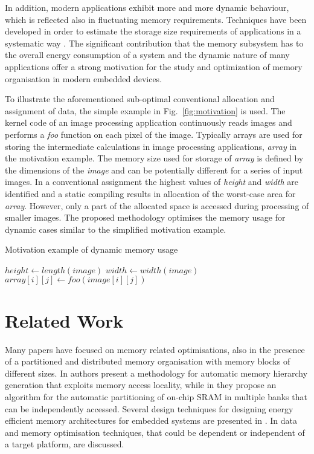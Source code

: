 \documentclass{acm_proc_article-sp}
\begin{document}
In addition, modern applications exhibit more and more dynamic behaviour, which is reflected also in fluctuating memory requirements. Techniques have been developed in order to estimate the storage size requirements of applications in a systematic way \cite{Ang13}. The significant contribution that the memory subsystem has to the overall energy consumption of a system and the dynamic nature of many applications offer a strong motivation for the study and optimization of memory organisation in modern embedded devices.

To illustrate the aforementioned sub-optimal conventional allocation and assignment of data, the simple example in Fig.~\ref{fig:motivation} is used. The kernel code of an image processing application continuously reads images and performs a \textit{foo} function on each pixel of the image. Typically arrays are used for storing the intermediate calculations in image processing applications, \textit{array} in the motivation example. The memory size used for storage of \textit{array}  is defined by the dimensions of the \textit{image} and can be potentially different for a series of input images. In a conventional assignment the highest values of \textit{height} and \textit{width} are identified and a static compiling results in allocation of the worst-case area for \textit{array}. However, only a part of the allocated space is accessed during processing of smaller images. The proposed methodology optimises the memory usage for dynamic cases similar to the simplified motivation example.

\begin{algorithm}[H]
\caption{Motivation example of dynamic memory usage}
 \label{fig:motivation}
 \begin{algorithmic}[1]
		\STATE $height \gets length(image)$
		\STATE $width \gets width(image)$
					\STATE $array[i][j] \gets foo(image[i][j])$
				\ENDFOR
			\ENDFOR
	\ENDWHILE
 \end{algorithmic}
\end{algorithm}



\section{Related Work}
\label{sec:related}

Many papers have focused on memory related optimisations, also in the presence of a partitioned and distributed memory organisation with memory blocks of different sizes. In \cite{Ben00b} authors present a methodology for automatic memory hierarchy generation that exploits memory access locality, while in \cite{Ben00c} they propose an algorithm for the automatic partitioning of on-chip SRAM in multiple banks that can be independently accessed. Several design techniques for designing energy efficient memory architectures for embedded systems are presented in \cite{Mac02}. In \cite{Pgk01} data and memory optimisation techniques, that could be dependent or independent of a target platform, are discussed. 
\end{document}
